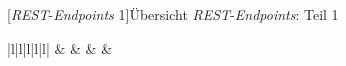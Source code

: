 [\textit{REST}-\textit{Endpoints} 1]{Übersicht \textit{REST}-\textit{Endpoints}: Teil 1}
\label{table:endpoints1}
\begin{table}
	\centering
	\begin{tabular}{|l|l|l|l|l|}
		\hline
		 &                                                   &                                                                   &  &                                                                           \\ \hline
		

\end{tabular}
\end{table}
